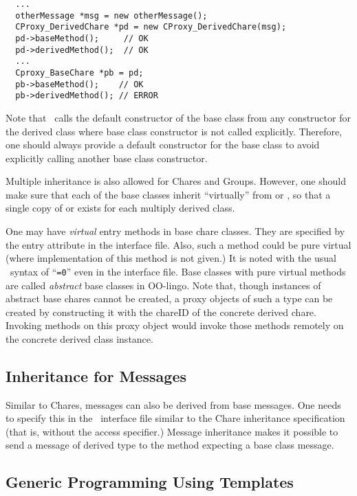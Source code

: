 \begin{verbatim}
  ...
  otherMessage *msg = new otherMessage();
  CProxy_DerivedChare *pd = new CProxy_DerivedChare(msg);
  pd->baseMethod();     // OK
  pd->derivedMethod();  // OK
  ...
  Cproxy_BaseChare *pb = pd;
  pb->baseMethod();    // OK
  pb->derivedMethod(); // ERROR
\end{verbatim}

Note that \CC\ calls the default constructor  of the base class from any
constructor for the derived class where base class constructor is not
called explicitly. Therefore, one should always provide a default constructor
for the base class to avoid explicitly calling another base class constructor.

Multiple inheritance  is also allowed for
Chares and Groups. However, one should make sure that each of the base
classes inherit ``virtually'' from  or , so that a
single copy of  or  exists for each multiply
derived class.

One may have {\em virtual} entry methods  in base chare
classes. They are specified by the entry attribute  in the
interface file. Also, such a method could be pure virtual  (where implementation of this method is not given.) It is
noted with the usual \CC\ syntax of ``{\tt =0}'' even in the interface
file. Base classes with pure virtual methods are called {\em abstract}
base classes  in OO-lingo. Note that,
though instances of abstract base chares cannot be created, a proxy
objects of such a type can be created by constructing it with the
chareID of the concrete derived chare. Invoking methods on this proxy
object would invoke those methods remotely on the concrete derived
class instance.

\subsection{Inheritance for Messages}

Similar to Chares, messages can also be derived from base messages. One needs
to specify this in the \charmpp\ interface file similar to the Chare
inheritance specification (that is, without the  access specifier.)
Message inheritance makes it possible to send a message of derived type to
the method expecting a base class message.

\subsection{Generic Programming Using Templates}


